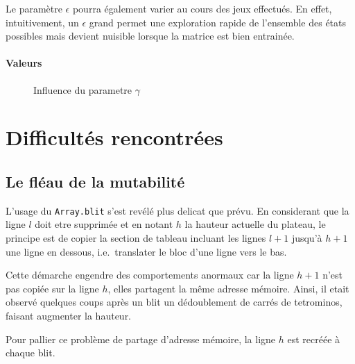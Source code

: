 \documentclass{article}
\begin{document}
Le paramètre \(\epsilon\) pourra \'egalement varier au cours des jeux effectués.
En effet, intuitivement, un \(\epsilon\) grand permet une exploration rapide de
l'ensemble des états possibles mais devient nuisible lorsque la matrice est bien
entrainée.

\paragraph{Valeurs}
\begin{figure}
  \centering
  \caption{Influence du parametre \(\gamma\)}
\end{figure}


\section{Difficultés rencontrées}

\subsection{Le fl\'eau de la mutabilit\'e}
L'usage du \texttt{Array.blit} s'est revélé plus delicat que prévu. En
considerant que la ligne \(l\) doit etre supprimée et en notant \(h\) la hauteur
actuelle du plateau, le principe est de copier la section de tableau incluant
les lignes \(l+1\) jusqu'à \(h+1\) une ligne en dessous, i.e.\ translater le
bloc d'une ligne vers le bas.

Cette démarche engendre des comportements anormaux car la ligne \(h+1\) n'est
pas copiée sur la ligne \(h\), elles partagent la même adresse mémoire. Ainsi,
il etait observé quelques coups après un blit un dédoublement de carrés de
tetrominos, faisant augmenter la hauteur.

Pour pallier ce problème de partage d'adresse mémoire, la ligne \(h\) est
recréée à chaque blit.
\end{document}
